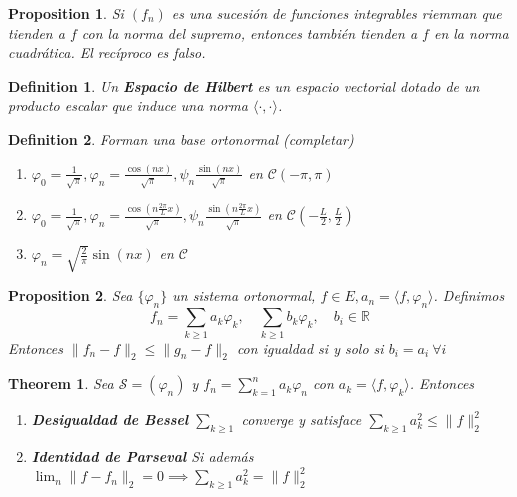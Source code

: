 \documentclass{myclass}
\newtheorem*{definition}{Definition}
\newtheorem*{theorem}{Theorem}
\newtheorem*{proposition}{Proposition}
\begin{document}
\begin{proposition}
Si $(f_n)$ es una sucesión de funciones integrables riemman que tienden a $f$ con la norma del supremo, entonces también tienden a $f$ en la norma cuadrática. El recíproco es falso.
\end{proposition}

\begin{definition}
Un \textbf{Espacio de Hilbert} es un espacio vectorial dotado de un producto escalar que induce una norma $\langle \cdot , \cdot  \rangle $.
\end{definition}

\begin{definition}
Forman una base ortonormal (completar)
\begin{enumerate}[topsep=-6pt, itemsep=0pt]
  \item $\displaystyle\varphi_0 = \frac{1}{\sqrt{\pi} }, \varphi_n = \frac{\cos(nx)}{\sqrt{\pi} }, \psi _n  \frac{\sin(nx)}{\sqrt{\pi} }$ en $\mathcal{C}(-\pi, \pi)$
  \item $\displaystyle\varphi_0 = \frac{1}{\sqrt{\pi} }, \varphi_n = \frac{\cos(n\frac{2\pi}{L}x)}{\sqrt{\pi} }, \psi _n  \frac{\sin(n\frac{2\pi}{L}x)}{\sqrt{\pi} }$ en $\mathcal{C}(-\frac{L}{2}, \frac{L}{2})$
  \item $\displaystyle\varphi _n = \sqrt{\frac{2}{\pi}}\sin(nx) $ en $\mathcal{C}$
\end{enumerate}
\end{definition}

\begin{proposition}
Sea  $\{\varphi _n\}$ un sistema ortonormal, $f \in  E, a_n = \langle f, \varphi _n \rangle $. Definimos 
\[
f_n = \sum_{k\ge 1} a_k\varphi_k, \quad \sum_{k\ge 1} b_k\varphi _k, \quad b_i \in \mathbb{R}
\] 
Entonces $\|f_n-f\|_2\le \|g_n-f\|_2$ con igualdad si y solo si $b_i=a_i \ \forall i$ 
\end{proposition}

\begin{theorem}
Sea $\mathcal{S} = (\varphi_n)$ y $f_n=\sum_{k= 1}^{n} a_k\varphi _n$ con $a_k = \langle f, \varphi_k  \rangle $. Entonces
\begin{enumerate}[topsep=-6pt, itemsep=0pt]
  \item \textbf{Desigualdad de Bessel} $\sum_{k\ge 1} $ converge y satisface $\sum_{k\ge 1} a_k^2\le \|f\|_{2}^2 $
  \item \textbf{Identidad de Parseval} Si además $\lim_{n}\|f-f_n\|_2=0 \implies  \sum_{k\ge 1} a_k^2 = \|f\|_2^2  $
\end{enumerate}
\end{theorem}
\end{document}

